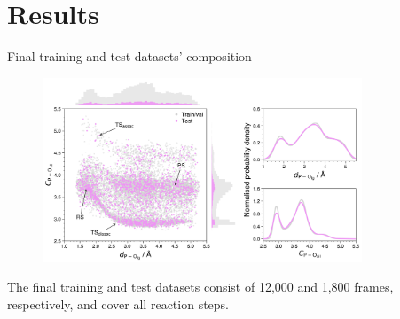 \documentclass[11pt,t]{beamer}
\begin{document}
\section{Results}
\begin{frame}{Final training and test datasets' composition}
	\vspace{-10pt}
	\begin{figure}
		\centering
		\includegraphics[width=0.85\textwidth]{Figures/results_final_dataset_with_histograms.png}
	\end{figure}
	\small
	The final training and test datasets consist of 12,000 and 1,800 frames, respectively, and cover all reaction steps.
\end{frame}
\end{document}
